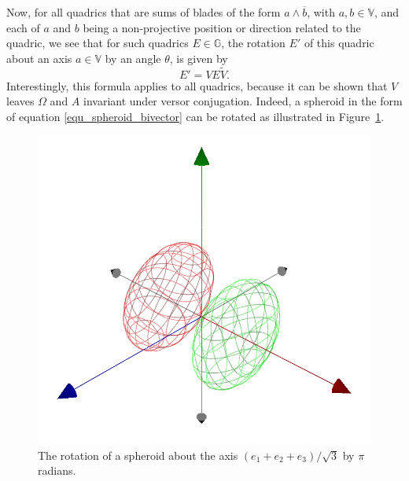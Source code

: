 \documentclass{birkjour}
\theoremstyle{definition}
\theoremstyle{remark}
\numberwithin{equation}{section}
\newcommand{\G}{\mathbb{G}}
\newcommand{\V}{\mathbb{V}}
\begin{document}
Now, for all quadrics
that are sums of blades of the form $a\wedge\overline{b}$, with $a,b\in\V$,
and each of $a$ and $b$ being a non-projective position or direction related to the quadric,
we see that for such quadrics $E\in\G$, the rotation $E'$ of this quadric
about an axis $a\in\V$ by an angle $\theta$, is given by
\begin{equation}
E' = VE\tilde{V}.
\end{equation}
Interestingly, this formula applies to all quadrics, because it can be shown
that $V$ leaves $\Omega$ and $A$ invariant under versor conjugation.
Indeed, a spheroid in the form of equation \eqref{equ_spheroid_bivector}
can be rotated as illustrated in Figure~\ref{fig_rot_spheroid}.
\begin{figure}
\includegraphics[scale=0.5]{RotatedSpheroid}
\caption{The rotation of a spheroid about the axis $(e_1+e_2+e_3)/\sqrt{3}$ by $\pi$ radians.}
\label{fig_rot_spheroid}
\end{figure}
\end{document}
